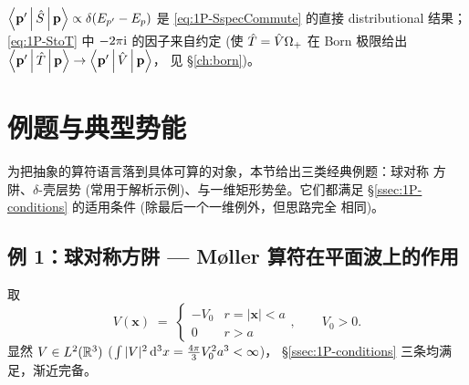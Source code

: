 \begin{corollary}
$\left\langle \mathbf{p}' \,\middle|\, \hat{S} \,\middle|\, \mathbf{p} \right\rangle\propto \delta(E_{p'}-E_p)$
是 \eqref{eq:1P-SspecCommute} 的直接 distributional 结果；
\eqref{eq:1P-StoT} 中 $-2\pi\mathrm{i}$ 的因子来自约定 (使
$\hat{T} = \hat{V}\Omega_+$ 在 Born 极限给出
$\left\langle \mathbf{p}' \,\middle|\, \hat{T} \,\middle|\, \mathbf{p} \right\rangle\to\left\langle \mathbf{p}' \,\middle|\, \hat{V} \,\middle|\, \mathbf{p} \right\rangle$，
见 \S\ref{ch:born})。
\end{corollary}

\section{例题与典型势能}
\label{sec:1P-examples}

为把抽象的算符语言落到具体可算的对象，本节给出三类经典例题：球对称
方阱、$\delta$-壳层势 (常用于解析示例)、与一维矩形势垒。它们都满足
\S\ref{ssec:1P-conditions} 的适用条件 (除最后一个一维例外，但思路完全
相同)。

\subsection{例 1：球对称方阱 — Møller 算符在平面波上的作用}
\label{ssec:1P-ex-square}

取
\begin{equation}
  V(\mathbf{x}) \;=\; \begin{cases} -V_0 & r=|\mathbf{x}|<a\\ 0 & r>a\end{cases},
  \qquad V_0>0.
  \label{eq:1P-VsquareWell}
\end{equation}
显然 $V\in L^2(\mathbb{R}^3)$ ($\int|V|^2\,\mathrm{d}^3x=\frac{4\pi}{3}V_0^2 a^3<\infty$)，
\S\ref{ssec:1P-conditions} 三条均满足，渐近完备。

